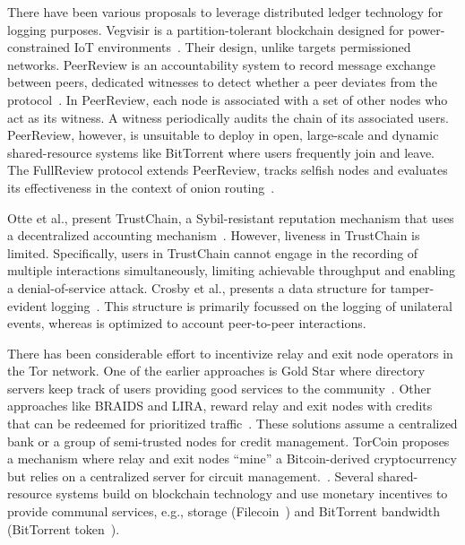 There have been various proposals to leverage distributed ledger technology for logging purposes.
Vegvisir is a partition-tolerant blockchain designed for power-constrained IoT environments~\cite{karlsson2018vegvisir}.
Their design, unlike \ModelName{} targets permissioned networks.
PeerReview is an accountability system to record message exchange between peers, dedicated witnesses to detect whether a peer deviates from the protocol~\cite{haeberlen2007peerreview}.
In PeerReview, each node is associated with a set of other nodes who act as its witness. A witness periodically audits the chain of its associated users.
PeerReview, however, is unsuitable to deploy in open, large-scale and dynamic shared-resource systems like BitTorrent where users frequently join and leave.
The FullReview protocol extends PeerReview, tracks selfish nodes and evaluates its effectiveness in the context of onion routing~\cite{diarra2014fullreview}.

Otte et al., present TrustChain, a Sybil-resistant reputation mechanism that uses a decentralized accounting mechanism~\cite{otte2017trustchain}.
However, liveness in TrustChain is limited.
Specifically, users in TrustChain cannot engage in the recording of multiple interactions simultaneously, limiting achievable throughput and enabling a denial-of-service attack.
Crosby et al., presents a data structure for tamper-evident logging~\cite{crosby2009efficient}.
This structure is primarily focussed on the logging of unilateral events, whereas \ModelName{} is optimized to account peer-to-peer interactions.

There has been considerable effort to incentivize relay and exit node operators in the Tor network.
One of the earlier approaches is Gold Star where directory servers keep track of users providing good services to the community~\cite{dingledine2010building}.
Other approaches like BRAIDS and LIRA, reward relay and exit nodes with credits that can be redeemed for prioritized traffic~\cite{jansen2010recruiting,jansen2013lira}.
These solutions assume a centralized bank or a group of semi-trusted nodes for credit management.
TorCoin proposes a mechanism where relay and exit nodes \enquote{mine} a Bitcoin-derived cryptocurrency but relies on a centralized server for circuit management.~\cite{ghosh2014torpath}.
Several shared-resource systems build on blockchain technology and use monetary incentives to provide communal services, e.g., storage (Filecoin~\cite{benet2018filecoin}) and BitTorrent bandwidth (BitTorrent token~\cite{bittorrenttoken}).

